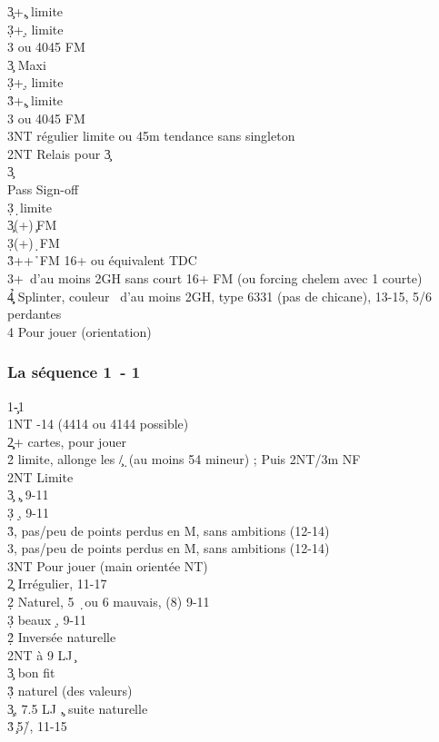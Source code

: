 \documentclass[a4paper]{article}
\begin{document}
\begin{bidtable}
3\c {}+\c , limite\\
3\d {}+\d , limite\\
3\s {} ou 4045 FM\-\\
3\c \> Maxi\+\\
3\d {}+\d , limite\\
3\h {}+\c , limite\\
3\s {} ou 4045 FM\\
3NT \> régulier limite ou 4\s 5m tendance sans singleton\-\-\\
2NT \> Relais pour 3\c \+\\
3\c\+\\
Pass \> Sign-off \c \\
3\d {}\d\ limite\-\-\\
3\c {}(+)\c\ FM\\
3\d {}(+)\d\ FM\\
3\h {}++\h\ FM 16+ ou équivalent TDC\\
3\s {}+\s\ d'au moins 2GH sans court 16+ FM (ou forcing chelem avec 1 courte)\\
4\c\d\h \> Splinter, couleur \s\ d'au moins 2GH, type 6331 (pas de chicane), 13-15, 5/6 perdantes\\
4\s \> Pour jouer (orientation)\-
\end{bidtable}

\subsubsection{La séquence 1\pdfc\ - 1\pdfs}

\begin{bidtable}
1\c-1\s\\
1NT -14 (4414 ou 4144 possible)\+\\
2\c\d {}+ cartes, pour jouer\\
2\h\s \> limite, allonge les \c /\d\ (au moins 54 mineur) ; Puis 2NT/3m NF\\
2NT \> Limite\\
3\c {} \c , 9-11\\
3\d {} \d , 9-11\\
3\h {}, pas/peu de points perdus en M, sans ambitions (12-14)\\
3\s {}, pas/peu de points perdus en M, sans ambitions (12-14)\\
3NT \> Pour jouer (main orientée NT)\-\\
2\c \> Irrégulier, 11-17\+\\
2\d \> Naturel, 5 \d\ ou 6 mauvais, (8) 9-11\\
3\d {} beaux \d , 9-11\-\\
2\d\h\s \> Inversée naturelle\\
2NT  à 9 LJ \c \+\\
3\c \> bon fit\\
3\d\h\s \> naturel (des valeurs)\-\\
3\c {}, 7.5 LJ \c , suite naturelle\\
3\h\s {}\c\ 5\h /\s , 11-15
\end{bidtable}
\end{document}
